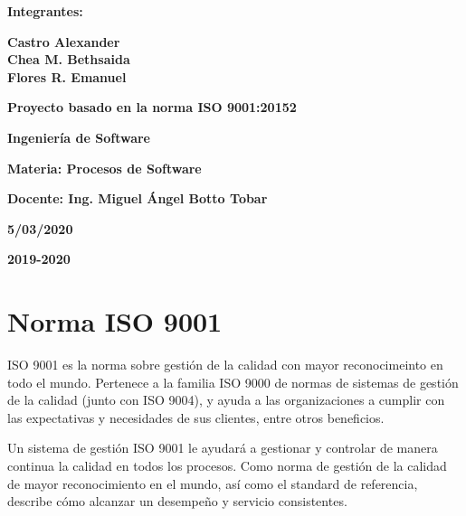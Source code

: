 \documentclass[12pt,a4paper]{article}
\begin{document}
{\begin{center}
{\Large\textbf{Integrantes:}
\par\vspace{0.2cm}

\Large\textbf{Castro Alexander}\\
\Large\textbf{Chea M. Bethsaida} \\
\Large\textbf{Flores R. Emanuel}\\
\par\vspace{0.5cm}
\Large\textbf{Proyecto basado en la norma ISO 9001:20152}
\par\vspace{1cm}
\Large\textbf{Ingenier\'ia de Software}
\par\vspace{1cm}
\Large\textbf{Materia: Procesos de Software}
\par\vspace{1cm}
\Large\textbf{Docente: Ing. Miguel \'Angel Botto Tobar }
}
\par\vspace{2cm}
\large\textbf{ 5/03/2020}

\par\vspace{0.5cm}
\large\textbf{2019-2020} 
\par\vspace{3cm} 

\end{center}
\clearpage
}

\tableofcontents
\par\vspace{16cm}

\section{Norma ISO 9001}\textbf{}


ISO 9001 es la norma sobre gestión de la calidad con mayor reconocimeinto en todo el mundo. Pertenece a la familia ISO 9000 de normas de sistemas de gestión de la calidad (junto con ISO 9004), y ayuda a las organizaciones a cumplir con las expectativas y necesidades de sus clientes, entre otros beneficios.

Un sistema de gestión ISO 9001 le ayudará a gestionar y controlar de manera continua la calidad en todos los procesos. Como norma de gestión de la calidad de mayor reconocimiento en el mundo, así como el standard de referencia, describe cómo alcanzar un desempeño y servicio consistentes.
\end{document}
